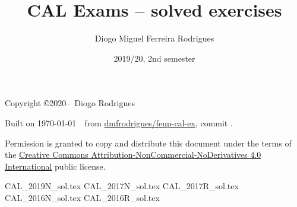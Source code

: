 \documentclass{cal}
\title{CAL Exams -- solved exercises}
\author{Diogo Miguel Ferreira Rodrigues \\ \email{dmfrodrigues2000@gmail.com}}
\date{2019/20, 2nd semester}
\begin{document}
\maketitle
\begin{secondpage}
    Copyright \copyright 2020--\the\year\ Diogo Rodrigues\par
    \par
    \immediate{}
    Built on \today~\currenttime~from \href{https://github.com/dmfrodrigues/feup-cal-ex}{dmfrodrigues/feup-cal-ex}, commit \unskip.\par
    Permission is granted to copy and distribute this document under the terms of the
    \href{https://creativecommons.org/licenses/by-nc-nd/4.0/}{Creative Commons Attribution-NonCommercial-NoDerivatives 4.0 International}
    public license.
\end{secondpage}
\frontmatter
\tableofcontents
\mainmatter
{CAL_2019N_sol.tex}
{CAL_2017N_sol.tex}
{CAL_2017R_sol.tex}
{CAL_2016N_sol.tex}
{CAL_2016R_sol.tex}
\end{document}
